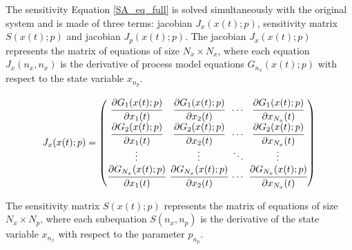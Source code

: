 \documentclass[../Article_Sensitivity_Analsysis.tex]{subfiles}
\begin{document}
	The sensitivity Equation \ref{SA_eq_full} is solved simultaneously with the original system and is made of three terms: jacobian ${J_x}({x}(t);{p})$, sensitivity matrix ${S}({x}(t);{p})$ and jacobian ${J_p}({x}(t);{p})$. The jacobian ${J_x}({x}(t);{p})$ represents the matrix of equations of size $N_x \times N_x$, where each equation ${J_x}(n_x,n_x)$ is the derivative of process model equations ${G}_{n_x}({x}(t);{p})$ with respect to the state variable $x_{n_p}$.
	
	{\footnotesize
		\begin{align}
			\begingroup %
			\setlength\arraycolsep{2pt}
			{J_x}({x}(t);{p})=\begin{pmatrix}
				\cfrac{\partial {G_{1}}({x}(t);{p})}{\partial {x_{1}}(t)} & \cfrac{\partial {G_{1}}({x}(t);{p})}{\partial {x_{2}}(t)} & \cdots & \cfrac{\partial {G_{1}}({x}(t);{p})}{\partial {x_{N_x}}(t)}\\
				\cfrac{\partial {G_{2}}({x}(t);{p})}{\partial {x_{1}}(t)} & \cfrac{\partial {G_{2}}({x}(t);{p})}{\partial {x_{2}}(t)} & \cdots & \cfrac{\partial {G_{2}}({x}(t);{p})}{\partial {x_{N_x}}(t)}\\
				\vdots & \vdots & \ddots & \vdots\\ 
				\cfrac{\partial {G_{N_x}}({x}(t);{p})}{\partial {x_{1}}(t)} & \cfrac{\partial {G_{N_x}}({x}(t);{p})}{\partial {x_{2}}(t)} & \cdots & \cfrac{\partial {G_{N_x}}({x}(t);{p})}{\partial {x_{N_x}}(t)}\\
			\end{pmatrix}
			\endgroup
	\end{align} }
	
	The sensitivity matrix ${S}({x}(t);{p})$ represents the matrix of equations of size $N_x \times N_p$, where each subequation ${S}(n_x,n_p)$ is the derivative of the state variable $x_{n_x}$ with respect to the parameter $p_{n_p}$.
	
\end{document}
